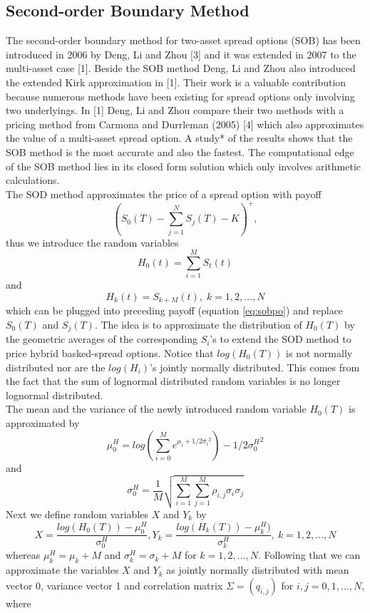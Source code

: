 \documentclass[a4paper]{article}
\begin{document}
\subsection{Second-order Boundary Method}
\label{sec:sob}
The second-order boundary method for two-asset spread options (SOB) has been introduced in 2006 by Deng, Li and Zhou [3] and it was extended in 2007 to the multi-asset case [1]. Beside the SOB method Deng, Li and Zhou also introduced the extended Kirk approximation in [1]. Their work is a valuable contribution because numerous methods have been existing for spread options only involving two underlyings. In [1] Deng, Li and Zhou compare their two methods with a pricing method from Carmona and Durrleman (2005) [4] which also approximates the value of a multi-asset spread option. A study* of the results shows that the SOB method is the most accurate and also the fastest. The computational edge of the SOB method lies in its closed form solution which only involves arithmetic calculations.\\
The SOD method approximates the price of a spread option with payoff
\begin{equation}
\label{eq:sobpo}
(S_0(T) - \sum_{j=1}^{N}S_j(T) - K)^+, 
\end{equation}
thus we introduce the random variables 
$$H_0(t)=\sum_{i=1}^M S_t(t)$$ 
and 
$$H_k(t)=S_{k+M}(t), \;k=1,2,...,N$$
which can be plugged into preceding payoff (equation \ref{eq:sobpo}) and replace $S_0(T)$ and $S_j(T)$. The idea is to approximate the distribution of $H_0(T)$ by the geometric averages of the corresponding  $S_i$'s to extend the SOD method to price hybrid basked-spread options. Notice that $log(H_0(T))$ is not normally distributed nor are the $log(H_i)$'s jointly normally distributed. This comes from the fact that the sum of lognormal distributed random variables is no longer lognormal distributed.\\
The mean and the variance of the newly introduced random variable $H_0(T)$ is approximated by 
$$\mu_0^H = log(\sum_{i=0}^{M}e^{\mu_i+1/2{\sigma_i}^2}) - 1/2{\sigma_0^H}^2$$ 
and 
$$\sigma_0^H=\frac{1}{M}\sqrt{\sum_{i=1}^M \sum_{j=1}^M \rho_{i,j} \sigma_i \sigma_j}$$
Next we define random variables $X$ and $Y_k$ by
$$X = \frac{log(H_0(T))-\mu_0^H}{\sigma_0^H}, Y_k = \frac{log(H_k(T))-\mu_k^H)}{\sigma_k^H}, \: k=1,2,...,N$$
whereas $\mu_k^H = \mu_k+M$ and $\sigma_k^H = \sigma_k+M$ for $k=1,2,...,N$. Following that we can approximate the variables $X$ and $Y_k$ as jointly normally distributed with mean vector 0, variance vector 1 and correlation matrix $\Sigma = (q_{i,j})$ for $i,j=0,1,...,N$, where 
\end{document}
